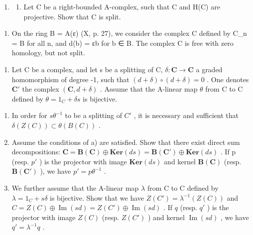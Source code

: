 \begin{enumerate}
\def\labelenumi{\arabic{enumi})}
\setcounter{enumi}{3}
\tightlist
\item
  \begin{enumerate}
  \def\labelenumii{\alph{enumii})}
  \tightlist
  \item
    Let C be a right-bounded A-complex, such that C and H(C) are projective. Show that C is split.
  \end{enumerate}
\end{enumerate}

\begin{enumerate}
\def\labelenumi{\alph{enumi})}
\setcounter{enumi}{1}
\tightlist
\item
  On the ring B = A(ε) (X, p. 27), we consider the complex C defined by C\_n = B for all n, and d(b) = εb for b ∈ B. The complex C is free with zero homology, but not split.
\end{enumerate}

\begin{enumerate}
\def\labelenumi{\arabic{enumi})}
\setcounter{enumi}{4}
\tightlist
\item
  Let C be a complex, and let s be a splitting of C, \(\delta: \mathbf{C} \to \mathbf{C}\) a graded homomorphism of degree -1, such that \((d + \delta) \circ (d + \delta) = 0\) . One denotes \(\mathbf{C}'\) the complex \((\mathbf{C}, d + \delta)\) . Assume that the A-linear map \(\theta\) from C to C defined by \(\theta = 1_C + \delta s\) is bijective.
\end{enumerate}

\begin{enumerate}
\def\labelenumi{\alph{enumi})}
\item
  In order for \(s\theta^{-1}\) to be a splitting of \(C'\) , it is necessary and sufficient that \(\delta(Z(C)) \subset \theta(B(C))\) .
\item
  Assume the conditions of a) are satisfied. Show that there exist direct sum decompositions: \(\mathbf{C} = \mathbf{B}(\mathbf{C}) \oplus \mathbf{Ker}(ds) = \mathbf{B}(\mathbf{C}') \oplus \mathbf{Ker}(ds)\) . If p (resp. \(p'\) ) is the projector with image \(\mathbf{Ker}(ds)\) and kernel \(\mathbf{B}(\mathbf{C})\) (resp. \(\mathbf{B}(\mathbf{C}')\) ), we have \(p' = p\theta^{-1}\) .
\item
  We further assume that the A-linear map \(\lambda\) from C to C defined by \(\lambda = 1_{C} + s\delta\) is bijective. Show that we have \(Z(C') = \lambda^{-1}(Z(C))\) and \(C = Z(C) \oplus \operatorname{Im}(sd) = Z(C') \oplus \operatorname{Im}(sd)\) . If \(q\) (resp. \(q'\) ) is the projector with image \(Z(C)\) (resp. \(Z(C')\) ) and kernel \(\operatorname{Im}(sd)\) , we have \(q' = \lambda^{-1} q\) .
\end{enumerate}

